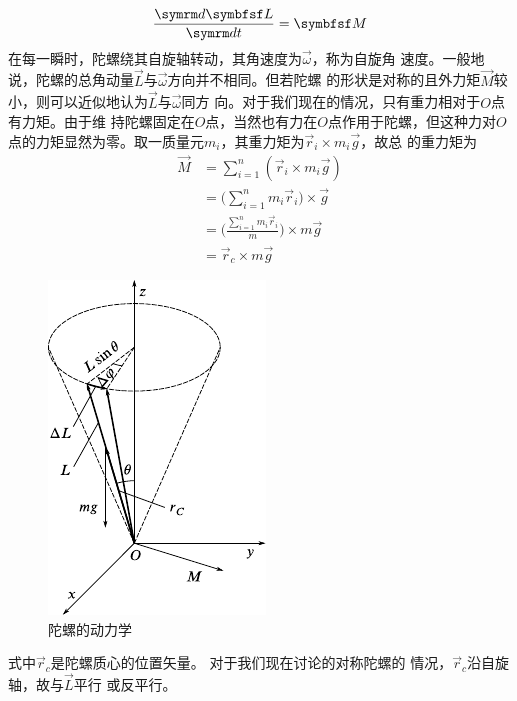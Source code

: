 \clearpage~\vspace{-1.56em}
\begin{equation}\label{eqn:10.05.01}
    \frac {  \dif \vec{L} } {  \dif t } = \vec{M}
\end{equation}
在每一瞬时，陀螺绕其自旋轴转动，其角速度为$ \vec{\omega} $，称为自旋角
速度。一般地说，陀螺的总角动量$\vec{L}$与$\vec{\omega}$方向并不相同。但若陀螺
的形状是对称的且外力矩$\vec{M}$较小，则可以近似地认为$\vec{L}$与$\vec{\omega}$同方
向。对于我们现在的情况，只有重力相对于$ O $点有力矩。由于维
持陀螺固定在$ O $点，当然也有力在$ O $点作用于陀螺，但这种力对$ O $
点的力矩显然为零。取一质量元$ m _ i $，其重力矩为$  \vec{r} _ { i } \times m _ { i } \vec{g}   $，故总
的重力矩为
\begin{equation*}
    \begin{split}
        \vec{M} &= \sum_{ i = 1 } ^ n \left( \vec{r} _ i \times m _ { i } \vec{g} \right) \\
                &= \Bigg( \sum_{ i = 1 } ^ n m _ i \vec{r} _ { i } \Bigg) \times \vec{g} \\
                &= \Bigg( \frac { \sum _{ i = 1 } ^ n m _ i \vec{r} _ i } { m } \Bigg) \times m \vec{g} \\
                &= \vec{r} _ { c } \times m \vec{g}
    \end{split}
\end{equation*}
\begin{figure}
    \vspace{-1em}
    \centering
    \includegraphics{figure/fig10.22}
    \caption{陀螺的动力学}
    \label{fig:10.22}
\end{figure}
式中$ \vec{r} _ c $是陀螺质心的位置矢量。
对于我们现在讨论的对称陀螺的
情况，$ \vec{r} _ c $沿自旋轴，故与$ \vec{L} $平行
或反平行。

